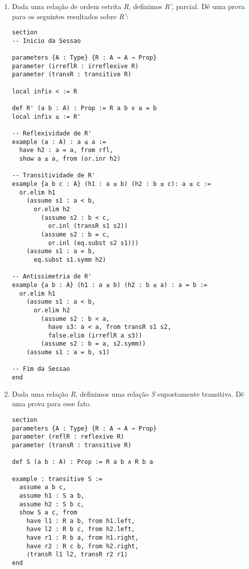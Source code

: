 \begin{enumerate}
\item Dada uma relação de ordem estrita \textit{R}, definimos \textit{R'}, parcial. Dê uma prova para os seguintes resultados sobre \textit{R'}:

\vspace{5mm}
\begin{lstlisting}
section
-- Inicio da Sessao

parameters {A : Type} {R : A → A → Prop}
parameter (irreflR : irreflexive R)
parameter (transR : transitive R)

local infix < := R

def R' (a b : A) : Prop := R a b ∨ a = b
local infix ≤ := R'

-- Reflexividade de R'
example (a : A) : a ≤ a :=
  have h2 : a = a, from rfl,
  show a ≤ a, from (or.inr h2)

-- Transitividade de R'
example {a b c : A} (h1 : a ≤ b) (h2 : b ≤ c): a ≤ c :=
  or.elim h1
    (assume s1 : a < b,
      or.elim h2
        (assume s2 : b < c,
          or.inl (transR s1 s2))
        (assume s2 : b = c,
          or.inl (eq.subst s2 s1)))
    (assume s1 : a = b,
      eq.subst s1.symm h2)

-- Antissimetria de R'
example {a b : A} (h1 : a ≤ b) (h2 : b ≤ a) : a = b :=
  or.elim h1
    (assume s1 : a < b,
      or.elim h2
        (assume s2 : b < a,
          have s3: a < a, from transR s1 s2,
          false.elim (irreflR a s3))
        (assume s2 : b = a, s2.symm))
    (assume s1 : a = b, s1)

-- Fim da Sessao
end
\end{lstlisting}
\vspace{5mm}

\item Dada uma relação \textit{R}, definimos uma relação \textit{S} supostamente transitiva. Dê uma prova para esse fato.

\vspace{5mm}
\begin{lstlisting}
section
parameters {A : Type} {R : A → A → Prop}
parameter (reflR : reflexive R)
parameter (transR : transitive R)

def S (a b : A) : Prop := R a b ∧ R b a

example : transitive S :=
  assume a b c,
  assume h1 : S a b,
  assume h2 : S b c,
  show S a c, from
    have l1 : R a b, from h1.left,
    have l2 : R b c, from h2.left,
    have r1 : R b a, from h1.right,
    have r2 : R c b, from h2.right,
    ⟨transR l1 l2, transR r2 r1⟩
end
\end{lstlisting}
\vspace{5mm}


\end{enumerate}

